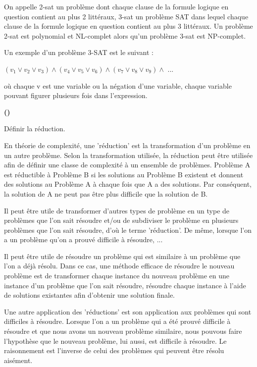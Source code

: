 \documentclass{article}
\newcounter{enoncecount}
\newcounter{sousenoncecount}
\newenvironment{sousenonce}
{%
\stepcounter{sousenoncecount}
\bf\small (\alph{sousenoncecount})
\begin{bf}
}
{%
\end{bf}
}
\begin{document}
On appelle 2-sat un problème dont chaque clause de la formule logique en question contient au plus 2 littéraux, 3-sat un problème SAT dans lequel chaque clause de la formule logique en question contient au plus 3 littéraux. Un problème 2-sat est polynomial et NL-complet alors qu'un problème 3-sat est NP-complet.

Un exemple d'un problème 3-SAT est le suivant :

$(v_{1} \vee v_{2} \vee v_{3}) \wedge (v_{4} \vee v_{5} \vee v_{6}) \wedge (v_{7} \vee v_{8} \vee v_{9}) \wedge$ ...	

où chaque v est une variable ou la négation d'une variable, chaque variable pouvant figurer plusieurs fois dans l'expression. 

\begin{sousenonce}
Définir la réduction.
\end{sousenonce}

En théorie de complexité, une 'réduction' est la transformation d'un problème en un autre problème. Selon la transformation utilisée, la réduction peut être utilisée afin de définir une classe de complexité à un ensemble de problèmes. Problème A est réductible à Problème B si les solutions au Problème B existent et donnent des solutions au Problème A à chaque fois que A a des solutions. Par conséquent, la solution de A ne peut pas être plus difficile que la solution de B. 

Il peut être utile de transformer d'autres types de problème en un type de problèmes que l'on sait résoudre et/ou de subdiviser le problème en plusieurs problèmes que l'on sait résoudre, d'où le terme 'réduction'. De même, lorsque l'on a un problème qu'on a prouvé difficile à résoudre, ...

Il peut être utile de résoudre un problème qui est similaire à un problème que l'on a déjà résolu. Dans ce cas, une méthode efficace de résoudre le nouveau problème est de transformer chaque instance du nouveau problème en une instance d'un problème que l'on sait résoudre, résoudre chaque instance à l'aide de solutions existantes afin d'obtenir une solution finale.

Une autre application des 'réductions' est son application aux problèmes qui sont difficiles à résoudre. Lorsque l'on a un problème qui a été prouvé difficile à résoudre et que nous avons un nouveau problème similaire, nous pouvous faire l'hypothèse que le nouveau problème, lui aussi, est difficile à résoudre. Le raisonnement est l'inverse de celui des problèmes qui peuvent être résolu aisément. 
\end{document}
